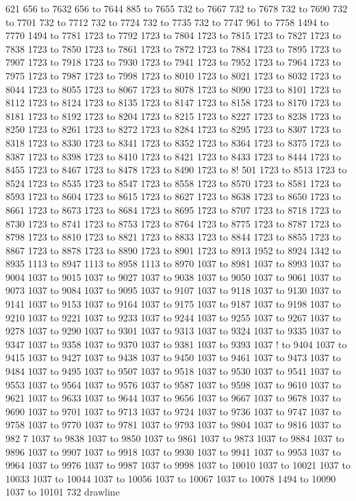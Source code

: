 621 656 to 7632 656 to 7644 885 to 7655 732 to 7667 732 to 7678 732 to 7690 732 to 7701 732 to 7712 732 to 7724 732 to 7735 732 to 7747 961 to 7758 1494 to 7770 1494 to 7781 1723 to 7792 1723 to 7804 1723 to 7815 1723 to 7827 1723 to 7838 1723 to 7850 1723 to 7861 1723 to 7872 1723 to 7884 1723 to 7895 1723 to 7907 1723 to 7918 1723 to 7930 1723 to 7941 1723 to 7952 1723 to 7964 1723 to 7975 1723 to 7987 1723 to 7998 1723 to 8010 1723 to 8021 1723 to 8032 1723 to 8044 1723 to 8055 1723 to 8067 1723 to 8078 1723 to 8090 1723 to 8101 1723 to 8112 1723 to 8124 1723 to 8135 1723 to 8147 1723 to 8158 1723 to 8170 1723 to 8181 1723 to 8192 1723 to 8204 1723 to 8215 1723 to 8227 1723 to 8238 1723 to 8250 1723 to 8261 1723 to 8272 1723 to 8284 1723 to 8295 1723 to 8307 1723 to 8318 1723 to 8330 1723 to 8341 1723 to 8352 1723 to 8364 1723 to 8375 1723 to 8387 1723 to 8398 1723 to 8410 1723 to 8421 1723 to 8433 1723 to 8444 1723 to 8455 1723 to 8467 1723 to 8478 1723 to 8490 1723 to 8!
501 1723 to 8513 1723 to 8524 1723
 to 8535 1723 to 8547 1723 to 8558 1723 to 8570 1723 to 8581 1723 to 8593 1723 to 8604 1723 to 8615 1723 to 8627 1723 to 8638 1723 to 8650 1723 to 8661 1723 to 8673 1723 to 8684 1723 to 8695 1723 to 8707 1723 to 8718 1723 to 8730 1723 to 8741 1723 to 8753 1723 to 8764 1723 to 8775 1723 to 8787 1723 to 8798 1723 to 8810 1723 to 8821 1723 to 8833 1723 to 8844 1723 to 8855 1723 to 8867 1723 to 8878 1723 to 8890 1723 to 8901 1723 to 8913 1952 to 8924 1342 to 8935 1113 to 8947 1113 to 8958 1113 to 8970 1037 to 8981 1037 to 8993 1037 to 9004 1037 to 9015 1037 to 9027 1037 to 9038 1037 to 9050 1037 to 9061 1037 to 9073 1037 to 9084 1037 to 9095 1037 to 9107 1037 to 9118 1037 to 9130 1037 to 9141 1037 to 9153 1037 to 9164 1037 to 9175 1037 to 9187 1037 to 9198 1037 to 9210 1037 to 9221 1037 to 9233 1037 to 9244 1037 to 9255 1037 to 9267 1037 to 9278 1037 to 9290 1037 to 9301 1037 to 9313 1037 to 9324 1037 to 9335 1037 to 9347 1037 to 9358 1037 to 9370 1037 to 9381 1037 to 9393 1037 !
to 9404 1037 to 9415 1037 to 9427 
1037 to 9438 1037 to 9450 1037 to 9461 1037 to 9473 1037 to 9484 1037 to 9495 1037 to 9507 1037 to 9518 1037 to 9530 1037 to 9541 1037 to 9553 1037 to 9564 1037 to 9576 1037 to 9587 1037 to 9598 1037 to 9610 1037 to 9621 1037 to 9633 1037 to 9644 1037 to 9656 1037 to 9667 1037 to 9678 1037 to 9690 1037 to 9701 1037 to 9713 1037 to 9724 1037 to 9736 1037 to 9747 1037 to 9758 1037 to 9770 1037 to 9781 1037 to 9793 1037 to 9804 1037 to 9816 1037 to 982
7 1037 to 9838 1037 to 9850 1037 to 9861 1037 to 9873 1037 to 9884 1037 to 9896 1037 to 9907 1037 to 9918 1037 to 9930 1037 to 9941 1037 to 9953 1037 to 9964 1037 to 9976 1037 to 9987 1037 to 9998 1037 to 10010 1037 to 10021 1037 to 10033 1037 to 10044 1037 to 10056 1037 to 10067 1037 to 10078 1494 to 10090 1037 to 10101 732 drawline


